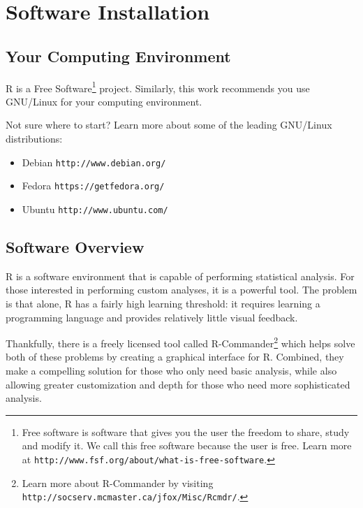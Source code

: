 %
%
%
%
%

\section{Software Installation}

\subsection{Your Computing Environment}
R is a Free Software\footnote{Free software is software that gives you the user the freedom to share, study and modify it. We call this free software because the user is free. Learn more at \texttt{http://www.fsf.org/about/what-is-free-software}.} project. Similarly, this work recommends you use GNU/Linux for your computing environment.

Not sure where to start? Learn more about some of the leading GNU/Linux distributions:

\begin{itemize}
 \item Debian \texttt{http://www.debian.org/}
 \item Fedora \texttt{https://getfedora.org/}
 \item Ubuntu \texttt{http://www.ubuntu.com/}
\end{itemize}

\subsection{Software Overview}
R is a software environment that is capable of performing statistical analysis. For those interested in performing custom analyses, it is a powerful tool. The problem is that alone, R has a fairly high learning threshold: it requires learning a programming language and provides relatively little visual feedback.

Thankfully, there is a freely licensed tool called R-Commander\footnote{Learn more about R-Commander by visiting \texttt{http://socserv.mcmaster.ca/jfox/Misc/Rcmdr/}.} which helps solve both of these problems by creating a graphical interface for R. Combined, they make a compelling solution for those who only need basic analysis, while also allowing greater customization and depth for those who need more sophisticated analysis.

